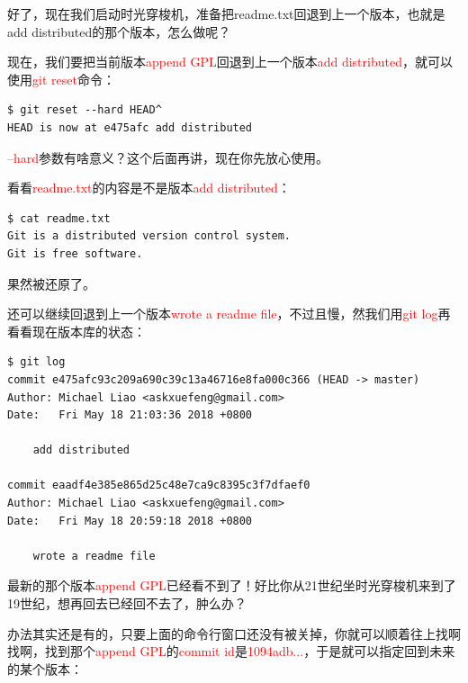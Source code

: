 好了，现在我们启动时光穿梭机，准备把readme.txt回退到上一个版本，也就是add distributed的那个版本，怎么做呢？


现在，我们要把当前版本\textcolor{red}{append GPL}回退到上一个版本\textcolor{red}{add distributed}，就可以使用\textcolor{red}{git reset}命令：

\begin{verbatim}
$ git reset --hard HEAD^
HEAD is now at e475afc add distributed
\end{verbatim}

\textcolor{red}{--hard}参数有啥意义？这个后面再讲，现在你先放心使用。

看看\textcolor{red}{readme.txt}的内容是不是版本\textcolor{red}{add distributed}：

\begin{verbatim}
$ cat readme.txt
Git is a distributed version control system.
Git is free software.
\end{verbatim}
果然被还原了。

还可以继续回退到上一个版本\textcolor{red}{wrote a readme file}，不过且慢，然我们用\textcolor{red}{git log}再看看现在版本库的状态：

\begin{verbatim}
$ git log
commit e475afc93c209a690c39c13a46716e8fa000c366 (HEAD -> master)
Author: Michael Liao <askxuefeng@gmail.com>
Date:   Fri May 18 21:03:36 2018 +0800

    add distributed

commit eaadf4e385e865d25c48e7ca9c8395c3f7dfaef0
Author: Michael Liao <askxuefeng@gmail.com>
Date:   Fri May 18 20:59:18 2018 +0800

    wrote a readme file
\end{verbatim}

最新的那个版本\textcolor{red}{append GPL}已经看不到了！好比你从21世纪坐时光穿梭机来到了19世纪，想再回去已经回不去了，肿么办？

办法其实还是有的，只要上面的命令行窗口还没有被关掉，你就可以顺着往上找啊找啊，找到那个\textcolor{red}{append GPL}的\textcolor{red}{commit id}是\textcolor{red}{1094adb...}，于是就可以指定回到未来的某个版本：

